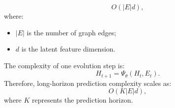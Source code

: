 \begin{equation} O(|E|d), \end{equation} where: \begin{itemize} \item $|E|$ is the number of graph edges; \item $d$ is the latent feature dimension. \end{itemize} The complexity of one evolution step is: \begin{equation} H_{t+1} = \Psi_\theta(H_t,E_t). \end{equation} Therefore, long-horizon prediction complexity scales as: \begin{equation} O(K|E|d), \end{equation} where $K$ represents the prediction horizon. %